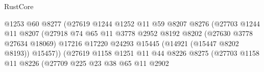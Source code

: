 \begin{lexlean}{RustCore}
\begin{coremodule}
                                            @1253
                                            @60
                                            @8277
                                            (@27619
                                              @1244
                                              @1252
                                              @11
                                              @59
                                              @8207
                                              @8276
                                              (@27703
                                                @1244
                                                @11
                                                @8207
                                                (@27918
                                                  @74
                                                  @65
                                                  @11
                                                  @3778
                                                  @2952
                                                  @8192
                                                  @8202
                                                  (@27630 @3778 @27634 @18069)
                                                  @17216
                                                  @17220
                                                  @24293
                                                  @15445
                                                  (@14921 (@15447 @8202 @8193))
                                                  @15457))
                                              (@27619
                                                @1158
                                                @1251
                                                @11
                                                @44
                                                @8226
                                                @8275
                                                (@27703
                                                  @1158
                                                  @11
                                                  @8226
                                                  (@27709
                                                    @225
                                                    @23
                                                    @38
                                                    @65
                                                    @11
                                                    @2902

\end{coremodule}
\end{lexlean}
